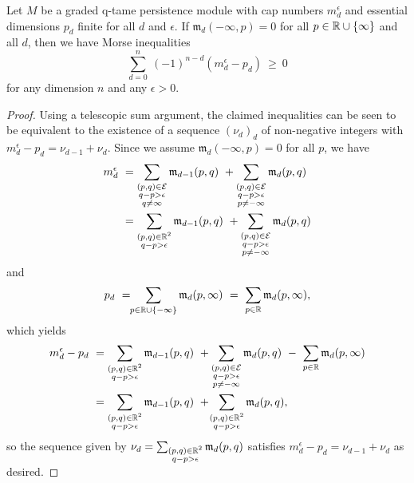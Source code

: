\begin{thm}\label{t:inequalities}
	Let $M$ be a graded q-tame persistence module with cap numbers $m_{d}^{\epsilon}$ and essential dimensions $p_{d}$ finite for all $d$ and $\epsilon$.
	If $\mathfrak{m}_d(-\infty, p) = 0$ for all $p \in \mathbb{R} \cup \{\infty\}$ and all $d$, then we have Morse inequalities
    \begin{equation} \label{e:morse inequalities}
    \sum_{d=0}^n \ (-1)^{n-d} (m^{\epsilon}_{d} - p_{d}) \ \geq\  0
    \end{equation}
    for any dimension $n$ and any $\epsilon > 0$.
\end{thm}

\begin{proof}
    Using a telescopic sum argument, the claimed inequalities can be seen to be equivalent to the existence of a sequence $(\nu_d)_d$ of non-negative integers with $m^{\epsilon}_{d} - p_{d} = \nu_{d-1} + \nu_{d}$.
    Since we assume $\mathfrak{m}_d(-\infty, p) = 0$ for all $p$, we have
    \begin{align*}
    m^{\epsilon}_{d}
    \ &=
    \sum_{\substack{(p,q) \in \mathcal{E} \\ q - p > \epsilon \\ q \neq \infty}} \mathfrak{m}_{d-1}(p,q)
    \ +
    \sum_{\substack{(p,q) \in \mathcal{E} \\ q - p > \epsilon \\ p \neq -\infty}}\mathfrak{m}_d(p,q)
    \\
    &=
    \sum_{\substack{(p,q) \in \mathbb{R}^2 \\ q - p > \epsilon }} \mathfrak{m}_{d-1}(p,q)
    \ +
    \sum_{\substack{(p,q) \in \mathcal{E} \\ q - p > \epsilon \\ p \neq -\infty}}\mathfrak{m}_d(p,q)
    \end{align*}
    and
    \begin{equation*}
    p_{d}
    \ = \!\!
    \sum_{p \in \mathbb{R} \cup \{-\infty\}} \mathfrak{m}_d(p,\infty)
    \ = \
    \sum_{p \in \mathbb{R}} \mathfrak{m}_d(p,\infty),
    \end{equation*}
    which yields
    \begin{align*}
    m^{\epsilon}_{d} - p_{d} \
    &= 
    \sum_{\substack{(p,q) \in \mathbb{R}^2 \\ q - p > \epsilon }} \mathfrak{m}_{d-1}(p,q)
    \ +
    \sum_{\substack{(p,q) \in \mathcal{E} \\ q - p > \epsilon \\ p \neq -\infty}}\mathfrak{m}_d(p,q)
    \ - \
    \sum_{p \in \mathbb{R}} \mathfrak{m}_d(p,\infty)
    \\
    &=
    \sum_{\substack{(p,q) \in \mathbb{R}^2 \\ q - p > \epsilon }} \mathfrak{m}_{d-1}(p,q)
    \ + \!
    \sum_{\substack{(p,q) \in \mathbb{R}^2 \\ q - p > \epsilon }}\mathfrak{m}_d(p,q),
    \end{align*}
    so the sequence given by $\nu_d = \sum_{\substack{(p,q) \in \mathbb{R}^2 \\ q - p > \epsilon }}\mathfrak{m}_d(p,q)$ satisfies $m^{\epsilon}_{d} - p_{d} = \nu_{d-1} + \nu_{d}$ as desired.
\end{proof}

